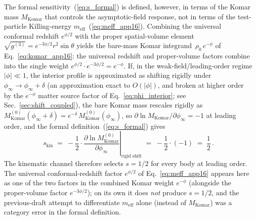\documentclass[11pt]{article}
\begin{document}
The formal sensitivity~(\ref{eq:s_formal}) is defined,
however, in terms of the Komar mass $M_{\mathrm{Komar}}$
that controls the asymptotic-field response, not in terms
of the test-particle Killing-energy
$m_{\mathrm{eff}}$~(\ref{eq:meff_app16}).  Combining the
universal conformal redshift $e^{\phi/2}$ with the proper
spatial-volume element $\sqrt{g^{(3)}}=e^{-3\phi/2}r^2
\sin\theta$ yields the bare-mass Komar
integrand~$\rho_0\,e^{-\phi}$ of
Eq.~\eqref{eq:komar_app16}: the universal redshift and
proper-volume factors combine into the single weight
$e^{\phi/2}\cdot e^{-3\phi/2}=e^{-\phi}$.  If, in the
weak-field/leading-order regime $|\phi|\ll1$, the interior
profile is approximated as shifting rigidly under
$\phi_\infty\to\phi_\infty+\delta$ (an approximation
exact to $O(|\phi|)$, and broken at higher order by the
$e^{-\phi}$ matter source factor of
Eq.~\ref{eq:phi_interior}; see
Sec.~\ref{sec:shift_coupled}), the bare Komar mass
rescales rigidly as
$M_{\mathrm{Komar}}^{(0)}(\phi_\infty+\delta)=
e^{-\delta}\,M_{\mathrm{Komar}}^{(0)}(\phi_\infty)$, so
$\partial\ln M_{\mathrm{Komar}}/\partial\phi_\infty=-1$ at
leading order, and the formal definition~(\ref{eq:s_formal})
gives
\begin{equation}\label{eq:s_kinematic}
  s_{\mathrm{kin}}
  \;=\;-\frac{1}{2}\cdot
  \left.\frac{\partial\ln M_{\mathrm{Komar}}^{(0)}}
       {\partial\phi_\infty}\right|_{\mathrm{rigid\;shift}}
  \;=\;-\frac{1}{2}\cdot(-1)\;=\;\frac{1}{2}\,.
\end{equation}
The kinematic channel therefore selects $s = 1/2$ for
every body at leading order.  The universal
conformal-redshift factor $e^{\phi/2}$ of
Eq.~\eqref{eq:meff_app16} appears here as one of the two
factors in the combined Komar weight $e^{-\phi}$ (alongside
the proper-volume factor $e^{-3\phi/2}$); on its own it
does \emph{not} produce $s=1/2$, and the previous-draft
attempt to differentiate $m_{\mathrm{eff}}$ alone (instead
of $M_{\mathrm{Komar}}$) was a category error in the
formal definition.
\end{document}
